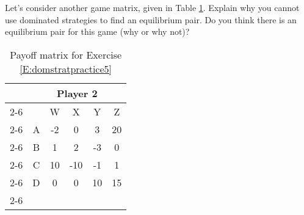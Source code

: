 \begin{xca}\label{E:domstratpractice5}
Let's consider another game matrix, given in Table \ref{T:domstratpractice5}. Explain why you cannot use dominated strategies to find an equilibrium pair. Do you think there is an equilibrium pair for this game (why or why not)?




\begin{table}[h]
\centering
\begin{tabular}{lccccc}
                      & \multicolumn{5}{c}{Player 2}                                                                                                  \\ \cline{2-6} 
\multicolumn{1}{l|}{} & \multicolumn{1}{c|}{} & \multicolumn{1}{c|}{W} & \multicolumn{1}{c|}{X} & \multicolumn{1}{c|}{Y} & \multicolumn{1}{c|}{Z} \\ \cline{2-6} 
\multicolumn{1}{l|}{Player 1} & \multicolumn{1}{c|}{A} & \multicolumn{1}{c|}{-2} & \multicolumn{1}{c|}{0} & \multicolumn{1}{c|}{3} & \multicolumn{1}{c|}{20} \\ \cline{2-6} 
\multicolumn{1}{l|}{} & \multicolumn{1}{c|}{B} & \multicolumn{1}{c|}{1} & \multicolumn{1}{c|}{2} & \multicolumn{1}{c|}{-3} & \multicolumn{1}{c|}{0} \\ \cline{2-6} 
\multicolumn{1}{l|}{} & \multicolumn{1}{c|}{C} & \multicolumn{1}{c|}{10} & \multicolumn{1}{c|}{-10} & \multicolumn{1}{c|}{-1} & \multicolumn{1}{c|}{1} \\ \cline{2-6} 
\multicolumn{1}{l|}{} & \multicolumn{1}{c|}{D} & \multicolumn{1}{c|}{0} & \multicolumn{1}{c|}{0} & \multicolumn{1}{c|}{10} & \multicolumn{1}{c|}{15} \\ \cline{2-6} 
\end{tabular}
\caption{Payoff matrix for Exercise \ref{E:domstratpractice5}}
\label{T:domstratpractice5}

\end{table}
\end{xca}


